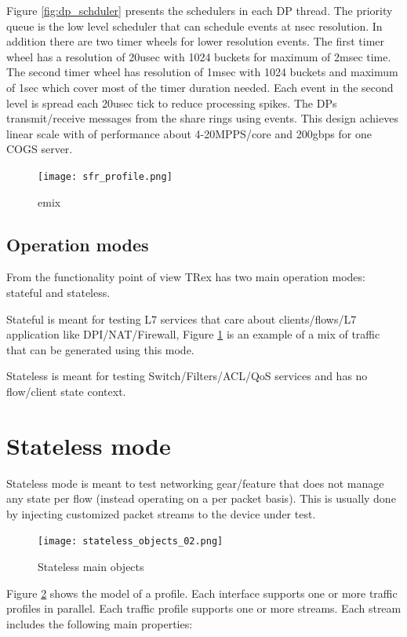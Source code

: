 \documentclass[conference]{IEEEtran}
\begin{document}
Figure \ref{fig:dp_schduler} presents the schedulers in each DP thread. The priority queue is the low level scheduler that can schedule events at nsec resolution. In addition there are two timer wheels for lower resolution events. The first timer wheel has a resolution of 20usec with 1024 buckets for maximum of 2msec time. 
The second timer wheel has resolution of 1msec with 1024 buckets and maximum of 1sec which cover most of the timer duration needed. Each event in the second level is spread each 20usec tick to reduce processing spikes. 
The DPs transmit/receive messages from the share rings using events. 
This design achieves linear scale with of performance about 4-20MPPS/core and 200gbps for one COGS server. 

\begin{figure}[h]
  \texttt{[image: sfr\_profile.png]}
  \caption{emix}
  \label{fig:emix}
\end{figure}

\subsection{Operation modes}

From the functionality point of view TRex has two main operation modes: stateful and stateless. 

Stateful is meant for testing L7 services that care about clients/flows/L7 application like DPI/NAT/Firewall, Figure \ref{fig:emix} is an example of a mix of traffic that can be generated using this mode. 

Stateless is meant for testing Switch/Filters/ACL/QoS services and has no flow/client state context.

\section{Stateless mode}

Stateless mode is meant to test networking gear/feature that does not manage any state per flow (instead operating on a per packet basis). 
This is usually done by injecting customized packet streams to the device under test.

\begin{figure}[h]
  \texttt{[image: stateless\_objects\_02.png]}
  \caption{Stateless main objects}
  \label{fig:stlobjects}
\end{figure}

Figure \ref{fig:stlobjects} shows the model of a profile. Each interface supports one or more traffic profiles in parallel.
Each traffic profile supports one or more streams. Each stream includes the following main properties:
\end{document}

